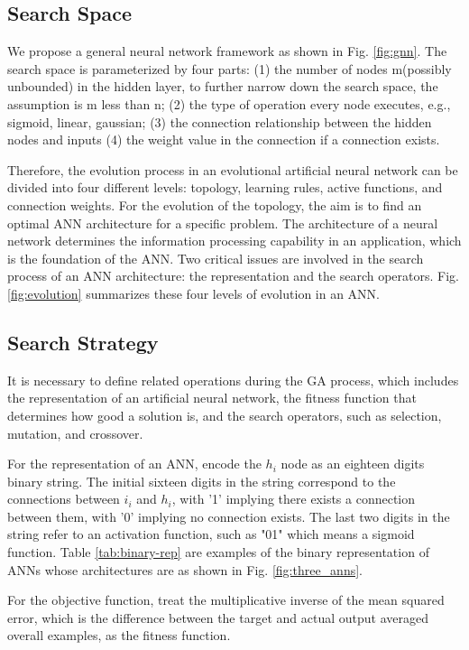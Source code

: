 \subsection{Search Space}
We propose a general neural network framework as shown in Fig. \ref{fig:gnn}.
The search space is parameterized by four parts: (1) the number of nodes
m(possibly unbounded) in the hidden layer, to further narrow down the search
space, the assumption is m less than n; (2) the type of operation every node
executes, e.g., sigmoid, linear, gaussian; (3) the connection relationship
between the hidden nodes and inputs (4) the weight value in the connection if a
connection exists.

Therefore, the evolution process in an evolutional artificial neural network can
be divided into four different levels: topology, learning rules, active
functions, and connection weights. For the evolution of the topology, the aim is
to find an optimal ANN architecture for a specific problem. The architecture of
a neural network determines the information processing capability in an
application, which is the foundation of the ANN. Two critical issues are
involved in the search process of an ANN architecture: the representation and
the search operators. Fig. \ref{fig:evolution} summarizes these four levels of
evolution in an ANN.

\subsection{Search Strategy}

It is necessary to define related operations during the GA process, which
includes the representation of an artificial neural network, the fitness
function that determines how good a solution is, and the search operators, such
as selection, mutation, and crossover.

For the representation of an ANN, encode the $h_i$ node as an eighteen digits
binary string. The initial sixteen digits in the string correspond to the
connections between $i_i$ and $h_i$, with '1' implying there exists a connection
between them, with '0' implying no connection exists. The last two digits in the
string refer to an activation function, such as "01" which means a sigmoid
function. Table \ref{tab:binary-rep} are examples of the binary representation
of ANNs whose architectures are as shown in Fig. \ref{fig:three_anns}. 

For the objective function, treat the multiplicative inverse of the mean squared
error, which is the difference between the target and actual output averaged
overall examples, as the fitness function.

